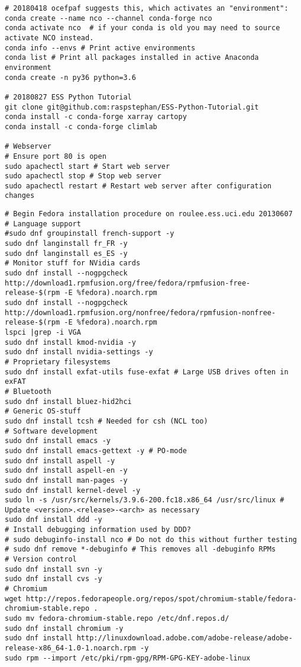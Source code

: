 \documentclass[12pt,twoside]{article}
\begin{document}
\begin{verbatim}
# 20180418 ocefpaf suggests this, which activates an "environment":
conda create --name nco --channel conda-forge nco
conda activate nco  # if your conda is old you may need to source activate NCO instead.
conda info --envs # Print active environments
conda list # Print all packages installed in active Anaconda environment
conda create -n py36 python=3.6

# 20180827 ESS Python Tutorial
git clone git@github.com:raspstephan/ESS-Python-Tutorial.git
conda install -c conda-forge xarray cartopy
conda install -c conda-forge climlab

# Webserver
# Ensure port 80 is open
sudo apachectl start # Start web server
sudo apachectl stop # Stop web server
sudo apachectl restart # Restart web server after configuration changes
\end{verbatim}
\begin{verbatim}
# Begin Fedora installation procedure on roulee.ess.uci.edu 20130607
# Language support
#sudo dnf groupinstall french-support -y
sudo dnf langinstall fr_FR -y
sudo dnf langinstall es_ES -y
# Monitor stuff for NVidia cards
sudo dnf install --nogpgcheck http://download1.rpmfusion.org/free/fedora/rpmfusion-free-release-$(rpm -E %fedora).noarch.rpm
sudo dnf install --nogpgcheck http://download1.rpmfusion.org/nonfree/fedora/rpmfusion-nonfree-release-$(rpm -E %fedora).noarch.rpm
lspci |grep -i VGA
sudo dnf install kmod-nvidia -y
sudo dnf install nvidia-settings -y
# Proprietary filesystems
sudo dnf install exfat-utils fuse-exfat # Large USB drives often in exFAT
# Bluetooth
sudo dnf install bluez-hid2hci
# Generic OS-stuff
sudo dnf install tcsh # Needed for csh (NCL too)
# Software development
sudo dnf install emacs -y
sudo dnf install emacs-gettext -y # PO-mode
sudo dnf install aspell -y
sudo dnf install aspell-en -y
sudo dnf install man-pages -y
sudo dnf install kernel-devel -y
sudo ln -s /usr/src/kernels/3.9.6-200.fc18.x86_64 /usr/src/linux # Update <version>.<release>-<arch> as necessary
sudo dnf install ddd -y
# Install debugging information used by DDD?
# sudo debuginfo-install nco # Do not do this without further testing
# sudo dnf remove *-debuginfo # This removes all -debuginfo RPMs
# Version control
sudo dnf install svn -y
sudo dnf install cvs -y
# Chromium
wget http://repos.fedorapeople.org/repos/spot/chromium-stable/fedora-chromium-stable.repo .
sudo mv fedora-chromium-stable.repo /etc/dnf.repos.d/
sudo dnf install chromium -y
sudo dnf install http://linuxdownload.adobe.com/adobe-release/adobe-release-x86_64-1.0-1.noarch.rpm -y
sudo rpm --import /etc/pki/rpm-gpg/RPM-GPG-KEY-adobe-linux

\end{verbatim}
\end{document}
